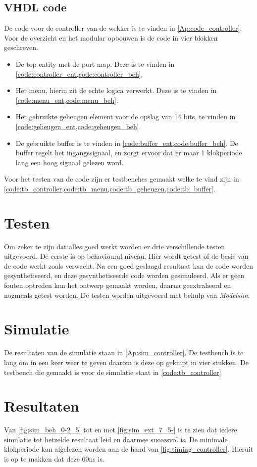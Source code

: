 \subsection{VHDL code}
De code voor de controller van de wekker is te vinden in \cref{Ap:code_controller}. Voor de overzicht en het modular opbouwen is de code in vier blokken geschreven.
\begin{itemize}[nolistsep]
\item De top entity met de port map. Deze is te vinden in \cref{code:controller_ent,code:controller_beh}.
\item Het menu, hierin zit de echte logica verwerkt. Deze is te vinden in \cref{code:menu_ent,code:menu_beh}.
\item Het gebruikte geheugen element voor de opslag van 14 bits, te vinden in \cref{code:geheugen_ent,code:geheugen_beh}.
\item De gebruikte buffer is te vinden in \cref{code:buffer_ent,code:buffer_beh}. De buffer regelt het ingangssignaal, en zorgt ervoor dat er maar 1 klokperiode lang een hoog signaal gelezen word.
\end{itemize}
Voor het testen van de code zijn er testbenches gemaakt welke te vind zijn in \cref{code:tb_controller,code:tb_menu,code:tb_geheugen,code:tb_buffer}.

\section{Testen}
Om zeker te zijn dat alles goed werkt worden er drie verschillende testen uitgevoerd. De eerste is op behavioural niveau. Hier wordt getest of de basis van de code werkt zoals verwacht. Na een goed geslaagd resultaat kan de code worden gesynthetiseerd, en deze gesynthetiseerde code worden gesimuleerd. Als er geen fouten optreden kan het ontwerp gemaakt worden, daarna geextraheerd en nogmaals getest worden. De testen worden uitgevoerd met behulp van \emph{Modelsim}.


\section{Simulatie}
De resultaten van de simulatie staan in \cref{Ap:sim_controller}. De testbench is te lang om in een keer weer te geven daarom is deze op geknipt in vier stukken. De testbench die gemaakt is voor de simulatie staat in \cref{code:tb_controller}
\section{Resultaten}
Van \cref{fig:sim_beh_0-2_5} tot en met \cref{fig:sim_ext_7_5-} is te zien dat iedere simulatie tot hetzelde resultaat leid en daarmee succesvol is.
De minimale klokperiode kan afgelezen worden aan de hand van \cref{fig:timing_controller}. Hieruit is op te makken dat deze 60ns is.
